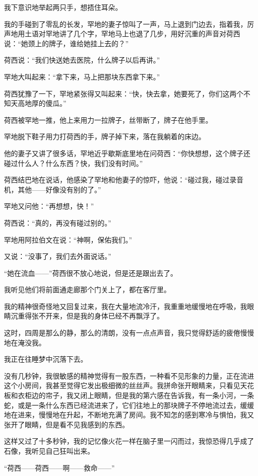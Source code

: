 \par 我下意识地举起两只手，想捂住耳朵。
\par 我的手碰到了零乱的长发，罕地的妻子惊叫了一声，马上退到门边去，指着我，厉声地用土语对罕地讲了几个字，罕地马上也退了几步，用好沉重的声音对荷西说：“她颈上的牌子，谁给她挂上去的？”
\par 荷西说：“我们快送她去医院，什么牌子以后再讲。”
\par 罕地大叫起来：“拿下来，马上把那块东西拿下来。”
\par 荷西犹豫了一下，罕地紧张得又叫起来：“快，快去拿，她要死了，你们这两个不知天高地厚的傻瓜。”
\par 荷西被罕地一推，他上来用力一拉牌子，丝带断了，牌子在他手里。
\par 罕地脱下鞋子用力打荷西的手，牌子掉下来，落在我躺着的床边。
\par 他的妻子又讲了很多话，罕地近乎歇斯底里地在问荷西：“你快想想，这个牌子还碰过什么人？什么东西？快，我们没有时间。”
\par 荷西结巴地在说话，他感染了罕地和他妻子的惊吓，他说：“碰过我，碰过录音机，其他——好像没有别的了。”
\par 罕地又问他：“再想想，快！”
\par 荷西说：“真的，再没有碰过别的。”
\par 罕地用阿拉伯文在说：“神啊，保佑我们。”
\par 又说：“没事了，我们去外面说话。”
\par “她在流血——”荷西很不放心地说，但是还是跟出去了。
\par 我听见他们将前面通走廊那个门关上了，都在客厅里。
\par 我的精神很奇怪地又回复过来，我在大量地流冷汗，我重重地缓慢地在呼吸，我眼睛沉重得张不开来，但是我的身体已经不再飘浮了。
\par 这时，四周是那么的静，那么的清朗，没有一点点声音，我只觉得舒适的疲倦慢慢地在淹没我。
\par 我正在往睡梦中沉落下去。
\par 没有几秒钟，我很敏感的精神觉得有一股东西，一种看不见形象的力量，正在流进这个小房间，我甚至觉得它发出极细微的丝丝声。我拼命张开眼睛来，只看见天花板和衣柜边的帘子，我又闭上眼睛，但是我的第六感在告诉我，有一条小河，一条蛇，或是一条什么东西已经流进来了，它们往地上的那块牌子不停地流过去，缓缓地在进来，慢慢地在升起，不断地充满了房间。我不知怎的感到寒冷与惧怕，我又张开了眼睛，但是看不见我感到的东西。
\par 这样又过了十多秒钟，我的记忆像火花一样在脑子里一闪而过，我惊恐得几乎成了石像，我听见自己狂叫出来。
\par “荷西——荷西——啊——救命——”
